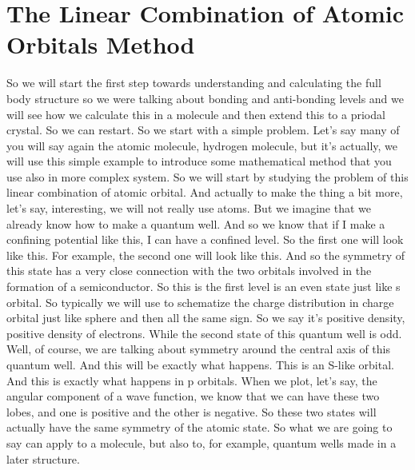 \section{The Linear Combination of Atomic Orbitals Method}
So we will start the first step towards understanding and calculating the full body structure so we were talking about bonding and anti-bonding levels and we will see how we calculate this in a molecule and then extend this to a priodal crystal. So we can restart. So we start with a simple problem.
Let's say many of you will say again the atomic molecule, hydrogen molecule, but it's actually, we will use this simple example to introduce some mathematical method that you use also in more complex system. So we will start by studying the problem of this linear combination of atomic orbital. And actually to make the thing a bit more, let's say, interesting, we will not really use atoms. But we imagine that we already know how to make a quantum well. And so we know that if I make a confining potential like this, I can have a confined level. So the first one will look like this. For example, the second one will look like this. And so the symmetry of this state has a very close connection with the two orbitals involved in the formation of a semiconductor. So this is the first level is an even state just like s orbital. So typically we will use to schematize the charge distribution in charge orbital just like sphere and then all the same sign. So we say it's positive density, positive density of electrons. While the second state of this quantum well is odd. Well, of course, we are talking about symmetry around the central axis of this quantum well. And this will be exactly what happens. This is an S-like orbital. And this is exactly what happens in p orbitals. When we plot, let's say, the angular component of a wave function, we know that we can have these two lobes, and one is positive and the other is negative. So these two states will actually have the same symmetry of the atomic state. So what we are going to say can apply to a molecule, but also to, for example, quantum wells made in a later structure.\\
